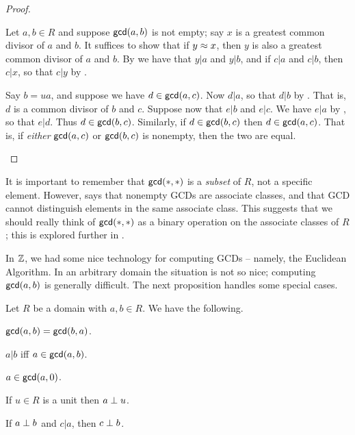 \begin{proof}
\begin{inlineproplist}
\item Let \(a,b \in R\) and suppose \(\mathsf{gcd}(a, b)\) is not empty; say \(x\) is a greatest common divisor of \(a\) and \(b\). It suffices to show that if \(y \approx x\), then \(y\) is also a greatest common divisor of \(a\) and \(b\). By  we have that \(y|a\) and \(y|b\), and if \(c|a\) and \(c|b\), then \(c|x\), so that \(c|y\) by .
\item Say \(b = ua\), and suppose we have \(d \in \mathsf{gcd}(a, c)\). Now \(d|a\), so that \(d|b\) by . That is, \(d\) is a common divisor of \(b\) and \(c\). Suppose now that \(e|b\) and \(e|c\). We have \(e|a\) by , so that \(e|d\). Thus \(d \in \mathsf{gcd}(b, c)\). Similarly, if \(d \in \mathsf{gcd}(b, c)\) then \(d \in \mathsf{gcd}(a, c)\). That is, if \emph{either} \(\mathsf{gcd}(a, c)\) or \(\mathsf{gcd}(b, c)\) is nonempty, then the two are equal.
\end{inlineproplist}
\end{proof}

It is important to remember that \(\mathsf{gcd}(\ast, \ast)\) is a \emph{subset} of \(R\), not a specific element. However,  says that nonempty GCDs are associate classes, and that GCD cannot distinguish elements in the same associate class. This suggests that we should really think of \(\mathsf{gcd}(\ast, \ast)\) as a binary operation on the associate classes of \(R\); this is explored further in .

In \(\mathbb{Z}\), we had some nice technology for computing GCDs -- namely, the Euclidean Algorithm. In an arbitrary domain the situation is not so nice; computing \(\mathsf{gcd}(a, b)\) is generally difficult. The next proposition handles some special cases.

\begin{prop} \label{prop:gcd-basics}
Let \(R\) be a domain with \(a,b \in R\). We have the following.
\begin{proplist*}
\item \(\mathsf{gcd}(a, b) = \mathsf{gcd}(b, a)\).
\item \(a|b\) iff \(a \in \mathsf{gcd}(a, b)\).
\item \(a \in \mathsf{gcd}(a, 0)\).
\item If \(u \in R\) is a unit then \(a \perp u\).
\item If \(a \perp b\) and \(c|a\), then \(c \perp b\). \label{prop:gcd-basics:coprime-factor}
\end{proplist*}
\end{prop}

